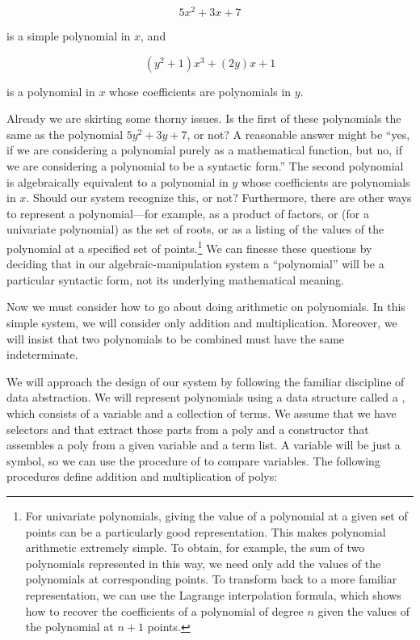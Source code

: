 $$ 5x^2 + 3x + 7 $$

\noindent
is a simple polynomial in \( x \), and

$$ (y^2 + 1)x^3 + (2y)x + 1 $$

\noindent
is a polynomial in \( x \) whose coefficients are polynomials in \( y \).

Already we are skirting some thorny issues.  Is the first of these polynomials
the same as the polynomial \( 5y^2 + 3y + 7 \), or not?  A reasonable answer
might be ``yes, if we are considering a polynomial purely as a mathematical
function, but no, if we are considering a polynomial to be a syntactic form.''
The second polynomial is algebraically equivalent to a polynomial in \( y \)
whose coefficients are polynomials in \( x \).  Should our system recognize this,
or not?  Furthermore, there are other ways to represent a polynomial---for
example, as a product of factors, or (for a univariate polynomial) as the set
of roots, or as a listing of the values of the polynomial at a specified set of
points.\footnote{For univariate polynomials, giving the value of a polynomial
at a given set of points can be a particularly good representation.  This makes
polynomial arithmetic extremely simple.  To obtain, for example, the sum of two
polynomials represented in this way, we need only add the values of the
polynomials at corresponding points.  To transform back to a more familiar
representation, we can use the Lagrange interpolation formula, which shows how
to recover the coefficients of a polynomial of degree \( n \) given the values of
the polynomial at \( n + 1 \) points.}  We can finesse these questions by
deciding that in our algebraic-manipulation system a ``polynomial'' will be a
particular syntactic form, not its underlying mathematical meaning.

Now we must consider how to go about doing arithmetic on polynomials.  In this
simple system, we will consider only addition and multiplication.  Moreover, we
will insist that two polynomials to be combined must have the same
indeterminate.

We will approach the design of our system by following the familiar discipline
of data abstraction.  We will represent polynomials using a data structure
called a , which consists of a variable and a collection of
terms.  We assume that we have selectors  and 
that extract those parts from a poly and a constructor  that
assembles a poly from a given variable and a term list.  A variable will be
just a symbol, so we can use the   procedure of
 to compare variables.  The following procedures define addition and
multiplication of polys:

